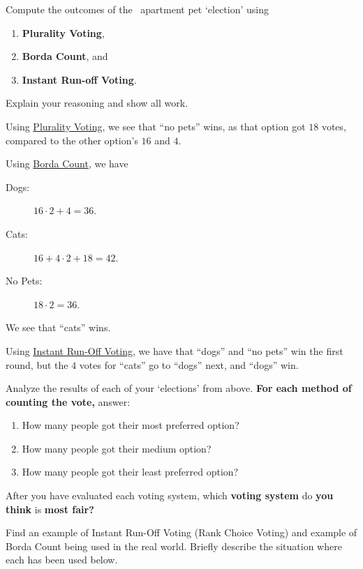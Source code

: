 \documentclass[nooutcomes,noauthor,hints,handout]{ximera}
\begin{document}
\mynewpage




\begin{question}
  Compute the outcomes of the \mooculus~apartment pet `election'
  using
  \begin{enumerate}
  \item \textbf{Plurality Voting},
  \item \textbf{Borda Count}, and
  \item \textbf{Instant Run-off Voting}.
  \end{enumerate}
  Explain your reasoning and show all work.
  \begin{freeResponse}
    Using \underline{Plurality Voting}, we see that ``no pets'' wins, as that
    option got $18$ votes, compared to the other option's $16$ and
    $4$.


    
    Using \underline{Borda Count}, we have
    \begin{description}
      \item[Dogs:] $16\cdot 2 + 4 = 36$.
      \item[Cats:] $16 +4\cdot 2+18 =42$.
      \item[No Pets:] $18\cdot 2 = 36$.
    \end{description}
  
  We see that ``cats'' wins.

  

  Using \underline{Instant Run-Off Voting}, we have that ``dogs'' and
  ``no pets'' win the first round, but the $4$ votes for ``cats'' go
  to ``dogs'' next, and ``dogs'' win.
  \end{freeResponse}
\end{question}
\mynewpage



\begin{question}
  Analyze the results of each of your `elections' from above. \textbf{For each
  method of counting the vote,} answer:
  \begin{enumerate}
  \item How many people got their most preferred option?
  \item How many people got their medium option? 
  \item How many people got their least preferred option?
  \end{enumerate}
  After you have evaluated each voting system, which \textbf{voting system} do
  \textbf{you think} is \textbf{most fair?}
\end{question}
\mynewpage








\begin{question}
  Find an example of Instant Run-Off Voting (Rank Choice Voting) and
  example of Borda Count being used in the real world. Briefly
  describe the situation where each has been used below.
    
\end{question}
\end{document}
